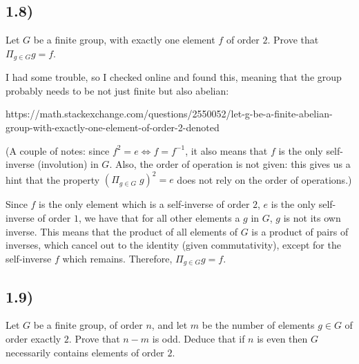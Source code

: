 \documentclass[12pt, letterpaper, twoside]{report}
\begin{document}
\subsection*{1.8)}


Let $G$ be a finite group, with exactly one element $f$ of order $2$. Prove that $\Pi_{g \in G} g = f$.



I had some trouble, so I checked online and found this, meaning that the group probably needs to be not just finite but also abelian:

https://math.stackexchange.com/questions/2550052/let-g-be-a-finite-abelian-group-with-exactly-one-element-of-order-2-denoted

(A couple of notes: since $f^2 = e \Leftrightarrow f = f^{-1}$, it also means that $f$ is the only self-inverse (involution) in $G$. Also, the order of operation is not given: this gives us a hint that the property $(\Pi_{g \in G} \; g)^2 = e$ does not rely on the order of operations.)

Since $f$ is the only element which is a self-inverse of order $2$, $e$ is the only self-inverse of order $1$, we have that for all other elements a $g$ in $G$, $g$ is not its own inverse. This means that the product of all elements of $G$ is a product of pairs of inverses, which cancel out to the identity (given commutativity), except for the self-inverse $f$ which remains. Therefore, $\Pi_{g \in G} g = f$.



\subsection*{1.9)}

Let $G$ be a finite group, of order $n$, and let $m$ be the number of elements $g \in G$ of order exactly $2$. Prove that $n - m$ is odd. Deduce that if $n$ is even then $G$ necessarily contains elements of order $2$.
\end{document}
